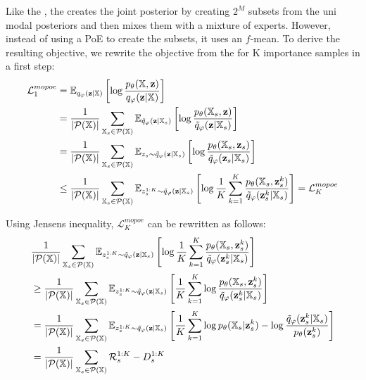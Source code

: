 Like the , the  creates the joint posterior by creating $2^M$ subsets from the uni modal posteriors and then mixes them with a mixture of experts.
However, instead of using a PoE to create the subsets, it uses an $f$-mean.
To derive the resulting objective, we rewrite the objective from the  for K importance samples in a first step:
\begin{equation}
    \begin{split}
        \mathcal{L}^{mopoe}_1 &= \mathbb{E}_{q_{\varphi}(\textbf{z}|\mathbb{X})} \left[ \log \frac{p_{\theta}(\mathbb{X}, \textbf{z})}{q_{\varphi}(\textbf{z}|\mathbb{X})} \right]\\
        &=\frac{1}{|\mathcal{P}(\mathbb{X})|} \sum _{\mathbb{X}_s \in \mathcal{P}(\mathbb{X})} \mathbb{E}_{\tilde{q}_{\varphi}(\textbf{z}|\mathbb{X}_s)} \left[ \log \frac{p_{\theta}(\mathbb{X}_s, \textbf{z})}{\tilde{q}_{\varphi}(\textbf{z}|\mathbb{X}_s)} \right]\\
        &=\frac{1}{|\mathcal{P}(\mathbb{X})|} \sum _{\mathbb{X}_s \in \mathcal{P}(\mathbb{X})} \mathbb{E}_{z_s \sim \tilde{q}_{\varphi}(\textbf{z}|\mathbb{X}_s)} \left[ \log \frac{p_{\theta}(\mathbb{X}_s, \textbf{z}_s)}{\tilde{q}_{\varphi}(\textbf{z}_s|\mathbb{X}_s)} \right]\\
        &\leq \frac{1}{|\mathcal{P}(\mathbb{X})|} \sum _{\mathbb{X}_s \in \mathcal{P}(\mathbb{X})} \mathbb{E}_{z^{1:K}_s \sim \tilde{q}_{\varphi}(\textbf{z}|\mathbb{X}_s)} \left[ \log \frac{1}{K} \sum _{k=1}^K \frac{p_{\theta}(\mathbb{X}_s, \textbf{z}^k _s)}{\tilde{q}_{\varphi}(\textbf{z}^k _s|\mathbb{X}_s)} \right] = \mathcal{L}^{mopoe}_K
    \end{split}
\end{equation}

Using Jensens inequality, $\mathcal{L}^{mopoe}_K$ can be rewritten as follows:
\begin{equation}
    \begin{split}
        &\frac{1}{|\powerset|} \sum _{\xsubset \in \powerset} \mathbb{E}_{z^{1:K}_s \sim \subsetpost} \left[ \log \frac{1}{K} \sum _{k=1}^K \frac{p_{\theta}(\xsubset, \textbf{z}^k _s)}{\tilde{q}_{\phi}(\textbf{z}^k _s|\xsubset)} \right]\\
%
        &\geq \frac{1}{|\powerset|} \sum _{\xsubset \in \powerset} \mathbb{E}_{z^{1:K}_s \sim \subsetpost} \left[ \frac{1}{K} \sum _{k=1}^K \log  \frac{p_{\theta}(\xsubset, \textbf{z}^k _s)}{\tilde{q}_{\phi}(\textbf{z}^k _s|\xsubset)} \right]\\
%
        &= \frac{1}{|\powerset|} \sum _{\xsubset \in \powerset} \mathbb{E}_{z^{1:K}_s \sim \subsetpost} \left[ \frac{1}{K} \sum _{k=1}^K \log p_\theta (\xsubset|\textbf{z}^k _s) -\log  \frac{\tilde{q}_{\phi}(\textbf{z}^k _s|\xsubset)}{p_{\theta}(\textbf{z}^k _s)} \right]\\
%
        &= \frac{1}{|\powerset|} \sum _{\xsubset \in \powerset} \mathcal{R}^{1:K}_s - D^{1:K}_s
    \end{split}
\end{equation}


